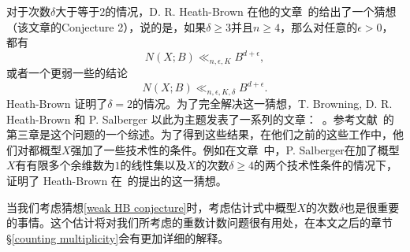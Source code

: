 对于次数$\delta$大于等于$2$的情况，D. R. Heath-Brown 在他的文章~的给出了一个猜想（该文章的Conjecture 2），说的是，如果$\delta \geqslant 3$并且$n \geqslant 4$，那么对任意的$\epsilon > 0$，都有
\begin{equation}
\label{strong HB conjecture}
N(X;B) \ll_{n,\epsilon,K} B^{d+\epsilon},
\end{equation}
或者一个更弱一些的结论
\begin{equation}
\label{weak HB conjecture}
N(X;B) \ll_{n,\epsilon,K,\delta} B^{d+\epsilon}.
\end{equation}
Heath-Brown 证明了$\delta=2$的情况。为了完全解决这一猜想，T. Browning, D. R. Heath-Brown 和 P. Salberger 以此为主题发表了一系列的文章：~。参考文献~的第三章是这个问题的一个综述。为了得到这些结果，在他们之前的这些工作中，他们对都概型$X$强加了一些技术性的条件。例如在文章~中，P. Salberger在加了概型$X$有有限多个余维数为$1$的线性集以及$X$的次数$\delta\geqslant4$的两个技术性条件的情况下，证明了 Heath-Brown 在~的提出的这一猜想。

当我们考虑猜想\eqref{weak HB conjecture}时，考虑估计式中概型$X$的次数$\delta$也是很重要的事情。这个估计将对我们所考虑的重数计数问题很有用处，在本文之后的章节\S\ref{counting multiplicity}会有更加详细的解释。

